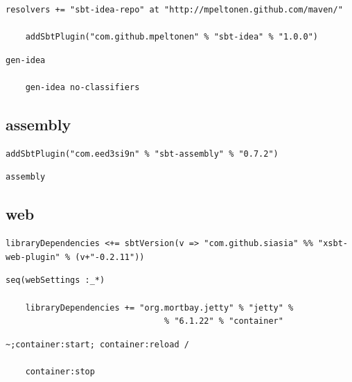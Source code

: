 \documentclass[utf8,utf8x]{beamer}
\begin{document}
\begin{frame}[fragile]

  \begin{lstlisting}[title={plugins.sbt}]
    resolvers += "sbt-idea-repo" at "http://mpeltonen.github.com/maven/"

    addSbtPlugin("com.github.mpeltonen" % "sbt-idea" % "1.0.0")
  \end{lstlisting}

  \begin{lstlisting}[title={usage}]
    gen-idea
    
    gen-idea no-classifiers
  \end{lstlisting}

\end{frame}

\subsection{assembly}

\begin{frame}[fragile]
  \begin{lstlisting}[title={plugins.sbt}]
    addSbtPlugin("com.eed3si9n" % "sbt-assembly" % "0.7.2")
  \end{lstlisting}

  \begin{lstlisting}[title={usage}]
    assembly
  \end{lstlisting}
\end{frame}

\subsection{web}

\begin{frame}[fragile]
  \begin{lstlisting}[title={plugins.sbt}]
    libraryDependencies <+= sbtVersion(v => "com.github.siasia" %% "xsbt-web-plugin" % (v+"-0.2.11"))
  \end{lstlisting}

  \begin{lstlisting}[title={build.sbt}]
    seq(webSettings :_*)

    libraryDependencies += "org.mortbay.jetty" % "jetty" %
                                % "6.1.22" % "container"
  \end{lstlisting}

  \begin{lstlisting}[title={usage}]
    ~;container:start; container:reload /    

    container:stop
  \end{lstlisting}
\end{frame}
\end{document}
